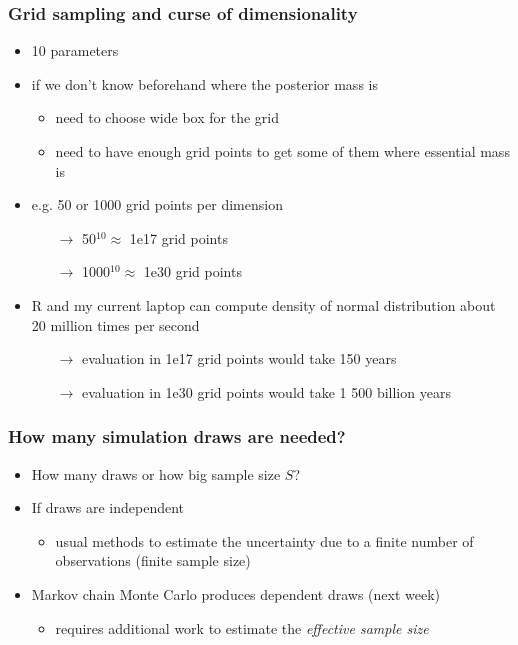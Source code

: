 \documentclass[10pt]{beamer}
\begin{document}
\begin{frame}
\frametitle{Grid sampling and curse of dimensionality}

  \begin{itemize}
      \item 10 parameters
      \item if we don't know beforehand where the posterior mass is
        \begin{itemize}
          \item need to choose wide box for the grid
          \item need to have enough grid points to get some of them
            where essential mass is
        \end{itemize}
      \item e.g. 50 or 1000 grid points per dimension
        \begin{itemize}
        \item[$\rightarrow$] 50$^{10} \approx$ 1e17 grid points
        \item[$\rightarrow$] 1000$^{10} \approx$ 1e30 grid points
        \end{itemize}
      \pause
      \item R and my current laptop can compute density of normal
        distribution about 20 million times per second
        \begin{itemize}
        \item[$\rightarrow$] evaluation in 1e17 grid points would take
           150 years %
        \item[$\rightarrow$] evaluation in 1e30 grid points would take
           1 500 billion years %
        \end{itemize}
 \end{itemize}

\end{frame}

\begin{frame}


\frametitle{How many simulation draws are needed?}

  \begin{itemize}
  \item How many draws or how big sample size $S$?
  \item If draws are independent
    \begin{itemize}
    \item usual methods to estimate the uncertainty due to a finite
      number of observations (finite sample size)
    \end{itemize}
  \item Markov chain Monte Carlo produces dependent draws (next week)
    \begin{itemize}
    \item requires additional work to estimate the \emph{effective
        sample size}
    \end{itemize}
  \end{itemize}

\end{frame}
\end{document}

